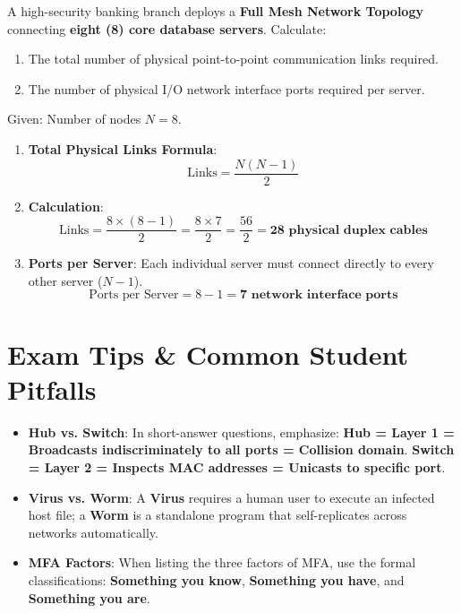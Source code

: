 \begin{example}
A high-security banking branch deploys a \textbf{Full Mesh Network Topology} connecting \textbf{eight (8) core database servers}. Calculate:
\begin{enumerate}[label=(\alph*)]
    \item The total number of physical point-to-point communication links required.
    \item The number of physical I/O network interface ports required per server.
\end{enumerate}

\begin{solutionbox}
Given: Number of nodes $N = 8$.

\begin{enumerate}[label=(\alph*)]
    \item \textbf{Total Physical Links Formula}:
    $$\text{Links} = \frac{N(N-1)}{2}$$
    \item \textbf{Calculation}:
    $$\text{Links} = \frac{8 \times (8 - 1)}{2} = \frac{8 \times 7}{2} = \frac{56}{2} = \mathbf{28\text{ physical duplex cables}}$$
    \item \textbf{Ports per Server}: Each individual server must connect directly to every other server ($N - 1$).
    $$\text{Ports per Server} = 8 - 1 = \mathbf{7\text{ network interface ports}}$$
\end{enumerate}
\end{solutionbox}
\end{example}

\section{Exam Tips \& Common Student Pitfalls}

\begin{examtip}
\begin{itemize}
    \item \textbf{Hub vs. Switch}: In short-answer questions, emphasize: \textbf{Hub = Layer 1 = Broadcasts indiscriminately to all ports = Collision domain}. \textbf{Switch = Layer 2 = Inspects MAC addresses = Unicasts to specific port}.
    \item \textbf{Virus vs. Worm}: A \textbf{Virus} requires a human user to execute an infected host file; a \textbf{Worm} is a standalone program that self-replicates across networks automatically.
    \item \textbf{MFA Factors}: When listing the three factors of MFA, use the formal classifications: \textbf{Something you know}, \textbf{Something you have}, and \textbf{Something you are}.
\end{itemize}
\end{examtip}


